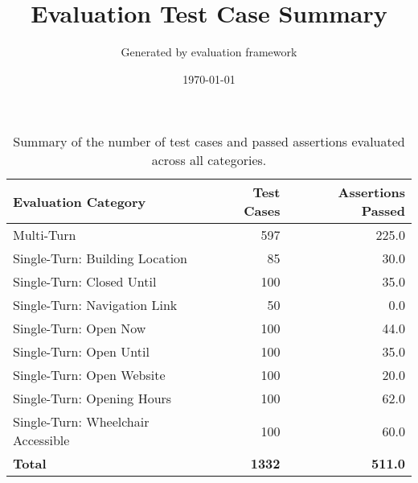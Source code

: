 \documentclass{article}
\title{Evaluation Test Case Summary}
\author{Generated by evaluation framework}
\date{\today}
\begin{document}
\maketitle
\begin{table}[h!]
\centering
\begin{tabular}{lrr}
\toprule
\textbf{Evaluation Category} & \textbf{Test Cases} & \textbf{Assertions Passed} \\
\midrule
Multi-Turn & 597 & 225.0 \\
Single-Turn: Building Location & 85 & 30.0 \\
Single-Turn: Closed Until & 100 & 35.0 \\
Single-Turn: Navigation Link & 50 & 0.0 \\
Single-Turn: Open Now & 100 & 44.0 \\
Single-Turn: Open Until & 100 & 35.0 \\
Single-Turn: Open Website & 100 & 20.0 \\
Single-Turn: Opening Hours & 100 & 62.0 \\
Single-Turn: Wheelchair Accessible & 100 & 60.0 \\

\midrule
\textbf{Total} & \textbf{1332} & \textbf{511.0} \\
\bottomrule
\end{tabular}
\caption{Summary of the number of test cases and passed assertions evaluated across all categories.}
\label{tab:evaluation_summary}
\end{table}
\end{document}
